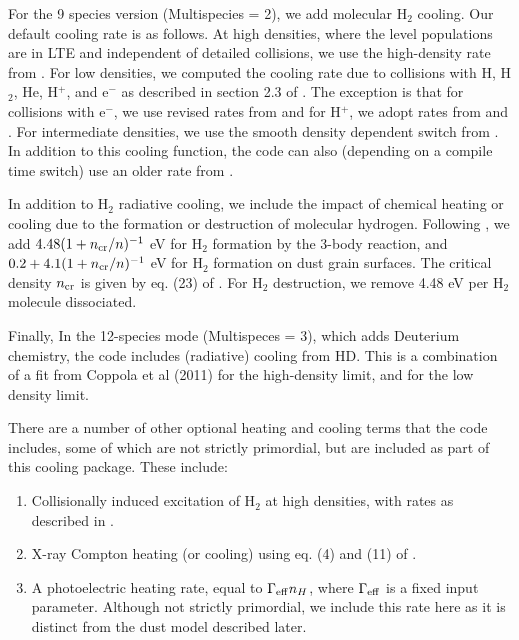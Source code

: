 For the 9 species version (Multispecies = 2), we add molecular H$_2$ cooling.  Our default cooling rate is as follows.  At high densities, where the level populations are in LTE and independent of detailed collisions, we use the high-density rate from \citet{1998A&A...335..403G}. For low densities, we computed the cooling rate due to collisions with H, H$_2$, He, H$^+$, and e$^-$ as described in section 2.3 of  \citet{2008MNRAS.388.1627G}.  The exception is that for collisions with e$^-$, we use revised rates from \citet{yoon2008cross} and for H$^+$, we adopt rates from \citet{2011PhRvL.107b3201H} and \citet{2012PhRvL.108j9903H}.  For intermediate densities, we use the smooth density dependent switch from \citet{1998A&A...335..403G}.  In addition to this cooling function, the code can also (depending on a compile time switch) use an older rate from \citet{1984ApJ...280..465L}.

\label{sec:chemheat}

In addition to H$_2$ radiative cooling, we include the impact of chemical heating or cooling due to the formation or destruction of molecular hydrogen.  Following \citet{2000ApJ...534..809O}, we add $4.48 (1 + n_{\rm cr}/n)^{-1}$ eV for H$_2$ formation by the 3-body reaction, and $0.2 + 4.1(1 + n_{\rm cr}/n)^{-1}$ eV for H$_2$ formation on dust grain surfaces.  The critical density $n_{\rm cr}$ is given by eq. (23) of  \citet{2000ApJ...534..809O}.  For H$_2$ destruction, we remove 4.48 eV per H$_2$ molecule dissociated.

Finally, In the 12-species mode (Multispeces = 3), which adds Deuterium chemistry, the code includes (radiative) cooling from HD.  This is a combination of a fit from Coppola et al (2011) for the high-density limit, and \citet{1998A&A...335..403G} for the low density limit.

There are a number of other optional heating and cooling terms that the code includes, some of which are not strictly primordial, but are included as part of this cooling package.  These include:  
\begin{enumerate}
\item Collisionally induced excitation of H$_2$ at high densities, with rates as described in \citet{2004MNRAS.348.1019R}.
\item X-ray Compton heating (or cooling) using eq. (4) and (11) of \citet{1999ApJ...517L...9M}.
\item A photoelectric heating rate, equal to $\Gamma_{\rm eff} n_H$, where $\Gamma_{\rm eff}$ is a fixed input parameter.  Although not strictly primordial, we include this rate here as it is distinct from the dust model described later.
\end{enumerate}


